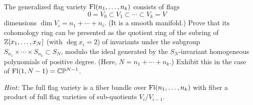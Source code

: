 \documentclass[12pt]{article}  %
\begin{document}
\begin{problem}[4]
The generalized flag variety $\operatorname{Fl}(n_1,\dots,n_k)$ consists of flags
\[0=V_0\subset V_1\subset \cdots \subset V_k=V\]
dimensions $\dim V_i = n_1+\cdots+n_i$.
(It is a smooth manifold.)
Prove that its cohomology ring can
be presented as the quotient ring of
the subring of $\mathbb{Z}[x_1,\dots,x_N]$ (with $\deg x_i=2$) of invariants under the subgroup
$S_{n_1}\times\cdots\times S_{n_k}\subset S_N$,
modulo the ideal generated by
the $S_N$-invariant homogeneous polynomials of positive degree.
(Here, $N=n_1+\cdots+n_k$.)
Exhibit this in the case of $\operatorname{Fl}(1,N-1)=\mathbb{C}\mathbb{P}^{N-1}$.

\noindent\textit{Hint:} The full flag variety is a fiber bundle over $\operatorname{Fl}(n_1,\dots,n_k)$ with fiber a product of full flag
varieties of sub-quotients $V_i/V_{i-1}$.
\end{problem}
\end{document}
